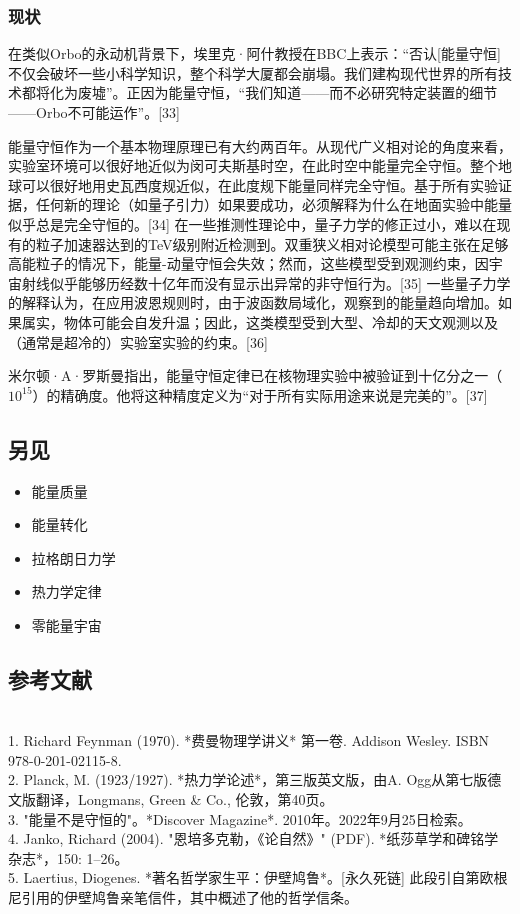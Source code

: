 \subsubsection{现状}
在类似Orbo的永动机背景下，埃里克·阿什教授在BBC上表示：“否认[能量守恒]不仅会破坏一些小科学知识，整个科学大厦都会崩塌。我们建构现代世界的所有技术都将化为废墟”。正因为能量守恒，“我们知道——而不必研究特定装置的细节——Orbo不可能运作”。[33]

能量守恒作为一个基本物理原理已有大约两百年。从现代广义相对论的角度来看，实验室环境可以很好地近似为闵可夫斯基时空，在此时空中能量完全守恒。整个地球可以很好地用史瓦西度规近似，在此度规下能量同样完全守恒。基于所有实验证据，任何新的理论（如量子引力）如果要成功，必须解释为什么在地面实验中能量似乎总是完全守恒的。[34] 在一些推测性理论中，量子力学的修正过小，难以在现有的粒子加速器达到的TeV级别附近检测到。双重狭义相对论模型可能主张在足够高能粒子的情况下，能量-动量守恒会失效；然而，这些模型受到观测约束，因宇宙射线似乎能够历经数十亿年而没有显示出异常的非守恒行为。[35] 一些量子力学的解释认为，在应用波恩规则时，由于波函数局域化，观察到的能量趋向增加。如果属实，物体可能会自发升温；因此，这类模型受到大型、冷却的天文观测以及（通常是超冷的）实验室实验的约束。[36]

米尔顿·A·罗斯曼指出，能量守恒定律已在核物理实验中被验证到十亿分之一（\(10^{15}\)）的精确度。他将这种精度定义为“对于所有实际用途来说是完美的”。[37]
\subsection{另见}
\begin{itemize}
\item 能量质量
\item 能量转化
\item 拉格朗日力学
\item 热力学定律
\item 零能量宇宙
\end{itemize}
\subsection{参考文献}\\
1. Richard Feynman (1970). *费曼物理学讲义* 第一卷. Addison Wesley. ISBN 978-0-201-02115-8.\\
2. Planck, M. (1923/1927). *热力学论述*，第三版英文版，由A. Ogg从第七版德文版翻译，Longmans, Green & Co., 伦敦，第40页。\\
3. "能量不是守恒的"。*Discover Magazine*. 2010年。2022年9月25日检索。\\
4. Janko, Richard (2004). "恩培多克勒，《论自然》" (PDF). *纸莎草学和碑铭学杂志*，150: 1–26。\\
5. Laertius, Diogenes. *著名哲学家生平：伊壁鸠鲁*。[永久死链] 此段引自第欧根尼引用的伊壁鸠鲁亲笔信件，其中概述了他的哲学信条。\\